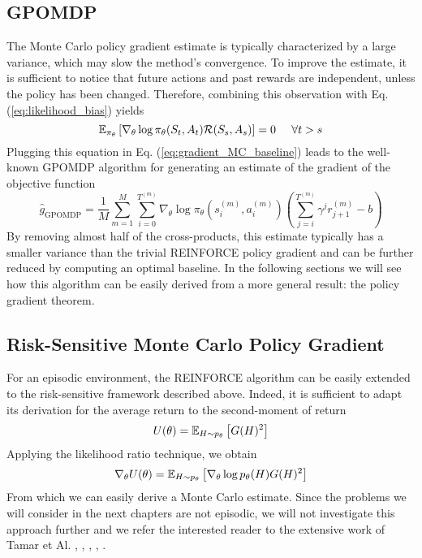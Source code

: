 \subsection{GPOMDP}
The Monte Carlo policy gradient estimate is typically characterized by a large variance, which may slow the method's convergence. To improve the estimate, it is sufficient to notice that future actions and past rewards are independent, unless the policy has been changed. Therefore, combining this observation with Eq. (\ref{eq:likelihood_bias}) yields
\begin{equation*}
	\E[\pi_\theta]{\nabla_\theta\log \pi_\theta(S_t, A_t) \calR(S_s, A_s)} = 0
	\;\;\;\;\; \forall t>s
\end{equation*}
Plugging this equation in Eq. (\ref{eq:gradient_MC_baseline}) leads to the well-known GPOMDP algorithm \cite{baxter2001infinite} for generating an estimate of the gradient of
the objective function
\begin{equation}
	\widehat{g}_{\text{GPOMDP}} = \frac{1}{M} \sum^{M}_{m=1} \sum_{i=0}^{T^{(m)}} 
	\nabla_\theta \log \pi_\theta(s_i^{(m)}, a_i^{(m)}) \left( 
	\sum^{T^{(m)}}_{j=i} \gamma^j r_{j+1}^{(m)} - b \right)
\end{equation}
By removing almost half of the cross-products, this estimate typically has a smaller variance than the trivial REINFORCE policy gradient and can be further reduced by computing an optimal baseline. In the following sections we will see how this algorithm can be easily derived from a more general result: the policy gradient theorem. 

\subsection{Risk-Sensitive Monte Carlo Policy Gradient}
For an episodic environment, the REINFORCE algorithm can be easily extended to the risk-sensitive framework described above. Indeed, it is sufficient to adapt its derivation for the average return to the second-moment of return
\begin{equation*}
	U(\theta) = \E[H\sim p_\theta]{G(H)^2}
\end{equation*}
Applying the likelihood ratio technique, we obtain
\begin{equation*}
	\nabla_\theta U(\theta) = \E[H\sim p_\theta]{\nabla_\theta \log p_\theta(H) G(H)^2}
\end{equation*}
From which we can easily derive a Monte Carlo estimate. Since the problems we will consider in the next chapters are not episodic, we will not investigate this approach further and we refer the interested reader to the extensive work of Tamar et Al. \cite{tamar2012policy}, \cite{tamar2013temporal}, \cite{tamar2013variance}, \cite{tamar2015policy}, \cite{chow2015risk}.

